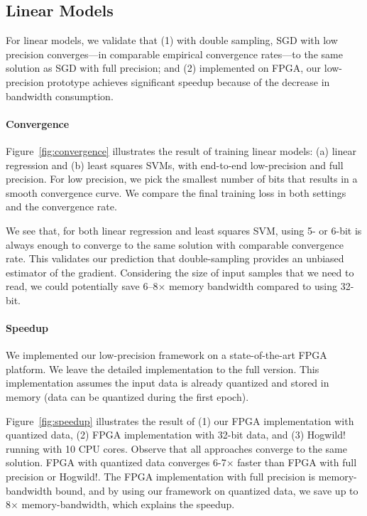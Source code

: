 \documentclass{article}
\begin{document}
\vspace{-1em}
\subsection{Linear Models}
\vspace{-0.5em}

For linear models, we validate that (1) 
with double sampling, SGD with low
precision converges---in
comparable empirical 
convergence rates---to the same solution
as SGD with full precision; and
(2) implemented on FPGA, our low-precision
prototype achieves significant speedup
because of the decrease in bandwidth
consumption.

\vspace{-1.5em}
\paragraph{Convergence}

Figure~\ref{fig:convergence} illustrates
the result of training linear models:
(a) linear
regression and (b) least squares SVMs,
with end-to-end low-precision and 
full precision. For
low precision, we pick the 
smallest number of bits that
results in a smooth convergence
curve. We compare the final 
training loss in both settings 
and the convergence rate.

\vspace{-0.5em}
We see that, for both linear regression 
and least squares SVM,
using 5- or 6-bit is always enough
to converge to the same solution
with comparable convergence rate. 
This validates our prediction that
double-sampling provides an
unbiased estimator of the gradient.
Considering the size of input
samples that we need to read, we
could potentially save 6--8$\times$ 
memory bandwidth compared to using 
32-bit. 

\vspace{-1em}
\paragraph{Speedup}
We implemented our low-precision 
framework on a state-of-the-art 
FPGA platform. We leave the detailed 
implementation to the full version.
This implementation assumes the input
data is already quantized and
stored in memory (data can be
quantized during the
first epoch).

\vspace{-0.5em}
Figure~\ref{fig:speedup} illustrates 
the result of (1) our FPGA
implementation with quantized data,
(2) FPGA implementation with 32-bit
data, and (3) Hogwild! running with
10 CPU cores. 
Observe that all approaches
converge to the same solution.
FPGA with quantized data converges
6-7$\times$ faster
than FPGA with full precision
or Hogwild!. The FPGA implementation
with full precision is
memory-bandwidth bound, and by using our framework on quantized data, we save 
up to 8$\times$ memory-bandwidth, which
explains the speedup.
\end{document}
